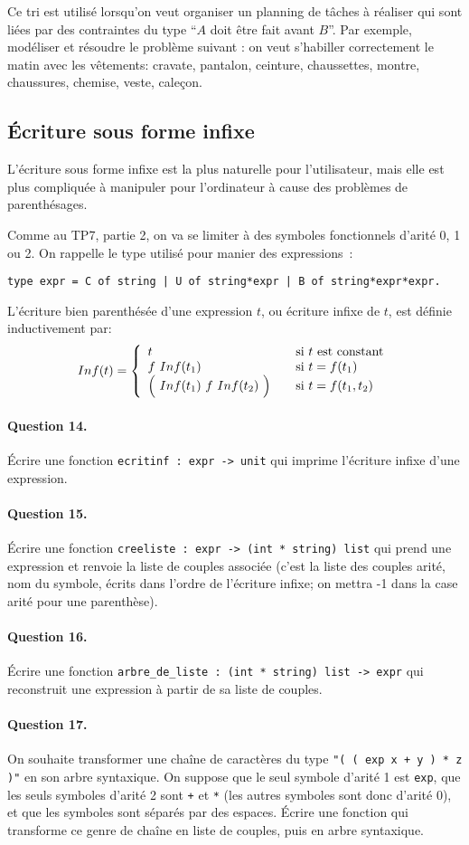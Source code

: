 \documentclass[10pt,a4paper]{article}
\begin{document}
Ce tri est utilisé lorsqu'on veut organiser un planning de tâches à réaliser qui 
sont liées par des contraintes du type ``$A$ doit être fait avant $B$''. Par exemple, 
modéliser et résoudre le problème suivant : on veut s'habiller correctement le matin 
avec les vêtements: cravate, pantalon, ceinture, chaussettes, montre, chaussures, 
chemise, veste, caleçon.

\subsection{Écriture sous forme infixe}
L'écriture sous forme infixe est la plus naturelle pour l'utilisateur, mais elle est 
plus compliquée à manipuler pour l'ordinateur à cause des problèmes de parenthésages.

Comme au TP7, partie 2, on va se limiter à des symboles fonctionnels d'arité 0, 1 ou 
2. On rappelle le type utilisé pour manier des expressions :
\begin{verbatim}type expr = C of string | U of string*expr | B of string*expr*expr.\end{verbatim}
L'écriture bien parenthésée d'une expression $t$, ou écriture infixe de $t$, est 
définie inductivement par:
\[Inf(t)=\left\lbrace
\begin{array}{lcl}
t & & \mathrm{si} \ t \ \mathrm{est \ constant}\\
f \ Inf(t_1) & & \mathrm{si} \ t = f(t_1)\\
\Big ( \normalsize \ Inf(t_1) \ f \ Inf(t_2) \ \Big ) \normalsize & & \mathrm{si} \ t = f(t_1,t_2)
\end{array}\right.\]
\paragraph{Question 14.} Écrire une fonction \texttt{ecritinf : expr -> unit} qui 
imprime l'écriture infixe d'une expression.
\paragraph{Question 15.} Écrire une fonction \texttt{creeliste : expr -> (int * string) list} 
qui prend une expression et renvoie la liste de couples associée (c'est la liste 
des couples arité, nom du symbole, écrits dans l'ordre de l'écriture infixe; on mettra 
-1 dans la case arité pour une parenthèse).
\paragraph{Question 16.} Écrire une fonction \texttt{arbre\_de\_liste : (int * string) list -> expr} 
qui reconstruit une expression à partir de sa liste de couples.
\paragraph{Question 17.} On souhaite transformer une chaîne de caractères du type 
\texttt{"( ( exp x + y ) * z )"} en son arbre syntaxique. On suppose que le seul 
symbole d'arité 1 est \texttt{exp}, que les seuls symboles d'arité 2 sont \texttt{+} 
et \texttt{*} (les autres symboles sont donc d'arité 0), et que les symboles sont séparés 
par des espaces. Écrire une fonction qui transforme ce genre de chaîne en liste de 
couples, puis en arbre syntaxique.
\end{document}
